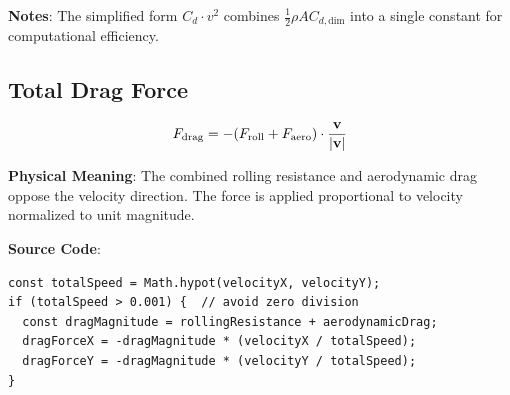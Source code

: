 \textbf{Notes}: The simplified form $C_d \cdot v^2$ combines $\frac{1}{2}\rho A C_{d,\text{dim}}$ into a single constant for computational efficiency.

\subsection{Total Drag Force}

\begin{equation}
  F_{\text{drag}} = -(F_{\text{roll}} + F_{\text{aero}}) \cdot \frac{\mathbf{v}}{|\mathbf{v}|}
  \label{eq:total-drag}
\end{equation}

\textbf{Physical Meaning}: The combined rolling resistance and aerodynamic drag oppose the velocity direction. The force is applied proportional to velocity normalized to unit magnitude.

\textbf{Source Code}: 

\begin{lstlisting}[caption={Drag force calculation}]
const totalSpeed = Math.hypot(velocityX, velocityY);
if (totalSpeed > 0.001) {  // avoid zero division
  const dragMagnitude = rollingResistance + aerodynamicDrag;
  dragForceX = -dragMagnitude * (velocityX / totalSpeed);
  dragForceY = -dragMagnitude * (velocityY / totalSpeed);
}
\end{lstlisting}

\newpage
